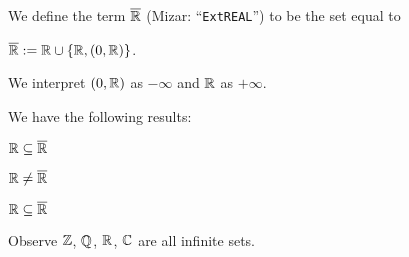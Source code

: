\documentclass{article}
\begin{document}
\begin{definition}\index{$\ExtRR$}%
We define the term $\ExtRR$ (Mizar: ``\verb#ExtREAL#'') to be the set
equal to
\begin{defn}
\item $\overline{\mathbb{R}} := \mathbb{R}\cup\{\mathbb{R},(0,\mathbb{R})\}$.
\end{defn}
\end{definition}
\begin{remark}
We interpret $(0,\mathbb{R})$ as $-\infty$ and $\mathbb{R}$ as $+\infty$.
\end{remark}

We have the following results:
\begin{thm}
\item\label{numbers:31} $\mathbb{R}\subseteq\overline{\mathbb{R}}$
\item\label{numbers:32} $\mathbb{R}\neq\overline{\mathbb{R}}$
\item\label{numbers:33} $\RR\properSubset\ExtRR$
\end{thm}

Observe $\mathbb{Z}$, $\mathbb{Q}$, $\mathbb{R}$, $\mathbb{C}$ are all infinite sets.
\end{document}
